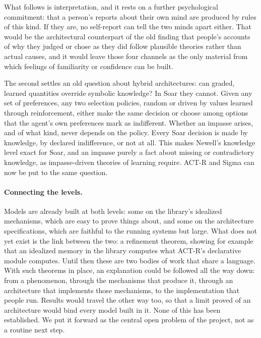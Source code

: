 \documentclass[11pt]{article}
\begin{document}
What follows is interpretation, and it rests on a further psychological
commitment: that a person's reports about their own mind are produced
by rules of this kind. If they are, no self-report can tell the two
minds apart either. That would be the architectural counterpart of the
old finding that people's accounts of why they judged or chose as they
did follow plausible theories rather than actual
causes\cite{nisbett1977}, and it would leave those four channels as the
only material from which feelings of familiarity or confidence can be
built.

The second settles an old question about hybrid architectures: can
graded, learned quantities override symbolic knowledge? In Soar they
cannot. Given any set of preferences, any two selection policies,
random or driven by values learned through reinforcement, either make
the same decision or choose among options that the agent's own
preferences mark as indifferent. Whether an impasse arises, and of what
kind, never depends on the policy. Every Soar decision is made by
knowledge, by declared indifference, or not at all. This makes Newell's
knowledge level\cite{newell1982} exact for Soar, and an impasse purely
a fact about missing or contradictory knowledge, as impasse-driven
theories of learning\cite{brown1980} require. ACT-R and Sigma can now
be put to the same question.

\paragraph{Connecting the levels.}
Models are already built at both levels: some on the library's
idealized mechanisms, which are easy to prove things about, and some on
the architecture specifications, which are faithful to the running
systems but large. What does not yet exist is the link between the two:
a refinement theorem, showing for
example that an idealized memory in the library computes what ACT-R's
declarative module computes. Until then these are two bodies of work
that share a language. With such theorems in place, an
explanation could be followed all the way down: from a phenomenon,
through the mechanisms that produce it, through an architecture that
implements those mechanisms, to the implementation that people run.
Results would travel the other way too, so that a limit proved of an
architecture would bind every model built in it. None of this has been
established. We put it forward as the central open problem of the
project, not as a routine next step.
\end{document}
